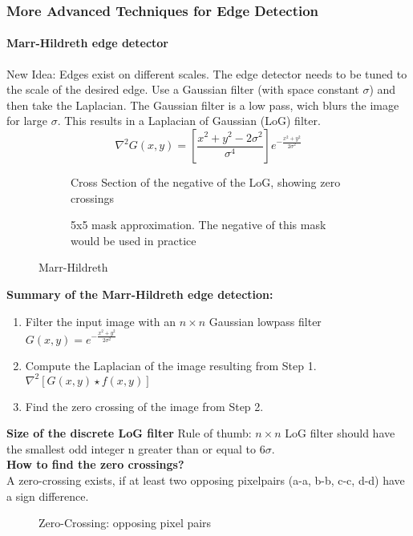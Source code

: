 \subsubsection{More Advanced Techniques for Edge Detection}
\paragraph{Marr-Hildreth edge detector}
New Idea: Edges exist on different scales. The edge detector needs to be tuned to the scale of the desired edge. Use a Gaussian filter (with space constant $\sigma$) and then take the Laplacian. The Gaussian filter is a low pass, wich blurs the image for large $\sigma$. This results in a Laplacian of Gaussian (LoG) filter.
\[
	\nabla^2 G(x,y) = \left[ \frac{x^2 + y^2 - 2 \sigma^2}{\sigma^4 } \right] e^{-\frac{x^2+y^2}{2 \sigma^2}}
\]

\begin{figure}[h]
	\centering
	\begin{subfigure}[b]{0.45\textwidth}
		\centering
		\caption{Cross Section of the negative of the LoG, showing zero crossings}
	\end{subfigure}
	\begin{subfigure}[b]{0.45\textwidth}
		\centering
		\caption{5x5 mask approximation. The negative of this mask would be used in practice}
	\end{subfigure}
	\caption{Marr-Hildreth}
\end{figure}

\textbf{Summary of the Marr-Hildreth edge detection:}
\begin{enumerate}
\item Filter the input image with an $n \times n$ Gaussian lowpass filter $G(x,y)=e^{-\frac{x^2+y^2}{2\sigma^2}}$
\item Compute the Laplacian of the image resulting from Step 1. $\nabla ^2[G(x,y) \star f(x,y)]$
\item Find the zero crossing of the image from Step 2.
\end{enumerate}
\textbf{Size of the discrete LoG filter}
Rule of thumb: $n \times n$ LoG filter should have the smallest odd integer n greater than or equal to $6\sigma$.\\
\textbf{How to find the zero crossings?}\\
A zero-crossing exists, if at least two opposing pixelpairs (a-a, b-b, c-c, d-d) have a sign difference.
\begin{figure}[!h]
	\centering
	\caption{Zero-Crossing: opposing pixel pairs}	
\end{figure}

